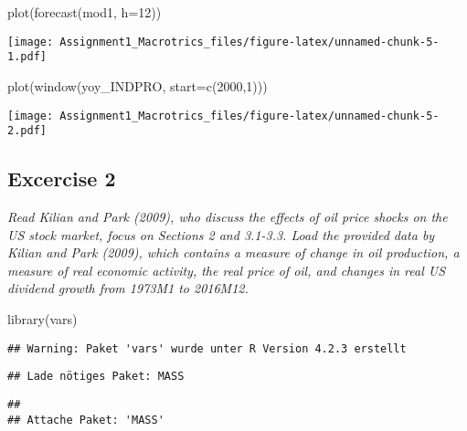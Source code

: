 \documentclass[
]{article}
\newenvironment{Shaded}{\begin{snugshade}}{\end{snugshade}}
\newcommand{\AttributeTok}[1]{\textcolor[rgb]{0.77,0.63,0.00}{#1}}
\newcommand{\DecValTok}[1]{\textcolor[rgb]{0.00,0.00,0.81}{#1}}
\newcommand{\FunctionTok}[1]{\textcolor[rgb]{0.00,0.00,0.00}{#1}}
\newcommand{\NormalTok}[1]{#1}
\begin{document}
\begin{Shaded}
\begin{Highlighting}[]
\FunctionTok{plot}\NormalTok{(}\FunctionTok{forecast}\NormalTok{(mod1, }\AttributeTok{h=}\DecValTok{12}\NormalTok{))}
\end{Highlighting}
\end{Shaded}

\texttt{[image: Assignment1\_Macrotrics\_files/figure-latex/unnamed-chunk-5-1.pdf]}

\begin{Shaded}
\begin{Highlighting}[]
\FunctionTok{plot}\NormalTok{(}\FunctionTok{window}\NormalTok{(yoy\_INDPRO, }\AttributeTok{start=}\FunctionTok{c}\NormalTok{(}\DecValTok{2000}\NormalTok{,}\DecValTok{1}\NormalTok{)))}
\end{Highlighting}
\end{Shaded}

\texttt{[image: Assignment1\_Macrotrics\_files/figure-latex/unnamed-chunk-5-2.pdf]}

\hypertarget{excercise-2}{%
\subsection{Excercise 2}\label{excercise-2}}

\textit{Read Kilian and Park (2009), who discuss the effects of oil price shocks on the US stock market, focus on Sections 2 and 3.1-3.3. Load the provided data by Kilian and Park (2009), which contains a measure of change in oil production, a measure of real economic activity, the real price of oil, and changes in real US dividend growth from 1973M1 to 2016M12.}

\begin{Shaded}
\begin{Highlighting}[]
\FunctionTok{library}\NormalTok{(vars)}
\end{Highlighting}
\end{Shaded}

\begin{verbatim}
## Warning: Paket 'vars' wurde unter R Version 4.2.3 erstellt
\end{verbatim}

\begin{verbatim}
## Lade nötiges Paket: MASS
\end{verbatim}

\begin{verbatim}
## 
## Attache Paket: 'MASS'
\end{verbatim}
\end{document}
